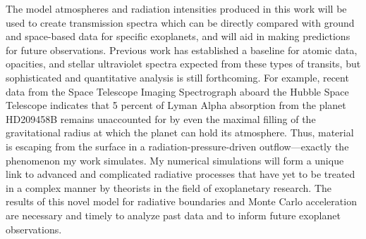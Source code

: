 \documentclass[]{article}
\begin{document}
The model atmospheres and radiation intensities produced in this work will be used to create transmission spectra which can be directly compared with ground and space-based data for specific exoplanets, and will aid in making predictions for future observations. Previous work has established a baseline for atomic data, opacities, and stellar ultraviolet spectra expected from these types of transits, but sophisticated and quantitative analysis is still forthcoming. For example, recent data from the Space Telescope Imaging Spectrograph aboard the Hubble Space Telescope indicates that 5 percent of Lyman Alpha absorption from the planet HD209458B remains unaccounted for by even the maximal filling of the gravitational radius at which the planet can hold its atmosphere. Thus, material is escaping from the surface in a radiation-pressure-driven outflow---exactly the phenomenon my work simulates. My numerical simulations will form a unique link to advanced and complicated radiative processes that have yet to be treated in a complex manner by theorists in the field of exoplanetary research. The results of this novel model for radiative boundaries and Monte Carlo acceleration are necessary and timely to analyze past data and to inform future exoplanet observations.
\end{document}
